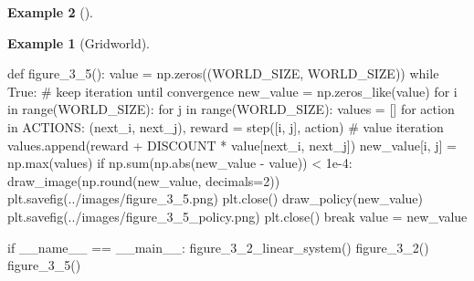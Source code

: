 \documentclass[
  letterpaper,
]{krantz}
\makeatletter
\newenvironment{Shaded}{\begin{snugshade}}{\end{snugshade}}
\newcommand{\BuiltInTok}[1]{\textcolor[rgb]{0.00,0.23,0.31}{#1}}
\newcommand{\CommentTok}[1]{\textcolor[rgb]{0.37,0.37,0.37}{#1}}
\newcommand{\ControlFlowTok}[1]{\textcolor[rgb]{0.00,0.23,0.31}{#1}}
\newcommand{\DecValTok}[1]{\textcolor[rgb]{0.68,0.00,0.00}{#1}}
\newcommand{\FloatTok}[1]{\textcolor[rgb]{0.68,0.00,0.00}{#1}}
\newcommand{\KeywordTok}[1]{\textcolor[rgb]{0.00,0.23,0.31}{#1}}
\newcommand{\NormalTok}[1]{\textcolor[rgb]{0.00,0.23,0.31}{#1}}
\newcommand{\OperatorTok}[1]{\textcolor[rgb]{0.37,0.37,0.37}{#1}}
\newcommand{\StringTok}[1]{\textcolor[rgb]{0.13,0.47,0.30}{#1}}
\newcommand{\VariableTok}[1]{\textcolor[rgb]{0.07,0.07,0.07}{#1}}
\newenvironment{kframe}{%
\medskip{}
\setlength{\fboxsep}{.8em}
 \def\at@end@of@kframe{}%
 \ifinner\ifhmode%
  \def\at@end@of@kframe{\end{minipage}}%
  \begin{minipage}{\columnwidth}%
 \fi\fi%
 \def\FrameCommand##1{\hskip\@totalleftmargin \hskip-\fboxsep
 \colorbox{shadecolor}{##1}\hskip-\fboxsep
     \hskip-\linewidth \hskip-\@totalleftmargin \hskip\columnwidth}%
 \MakeFramed {\advance\hsize-\width
   \@totalleftmargin\z@ \linewidth\hsize
   \@setminipage}}%
 {\par\unskip\endMakeFramed%
 \at@end@of@kframe}
\renewenvironment{Shaded}{\begin{kframe}}{\end{kframe}}
\theoremstyle{plain}
\theoremstyle{definition}
\newtheorem{example}{Example}[chapter]
\theoremstyle{definition}
\theoremstyle{remark}
\makeatother
\begin{document}
\begin{example}[]
\begin{example}[Gridworld]
\begin{tcolorbox}[enhanced jigsaw, bottomrule=.15mm, opacityback=0, breakable, colframe=quarto-callout-tip-color-frame, left=2mm, rightrule=.15mm, toprule=.15mm, leftrule=.75mm, arc=.35mm, colback=white]
\begin{codelisting}[H]
\begin{Shaded}
\begin{Highlighting}[]
\KeywordTok{def}\NormalTok{ figure\_3\_5():}
\NormalTok{    value }\OperatorTok{=}\NormalTok{ np.zeros((WORLD\_SIZE, WORLD\_SIZE))}
    \ControlFlowTok{while} \VariableTok{True}\NormalTok{:}
        \CommentTok{\# keep iteration until convergence}
\NormalTok{        new\_value }\OperatorTok{=}\NormalTok{ np.zeros\_like(value)}
        \ControlFlowTok{for}\NormalTok{ i }\KeywordTok{in} \BuiltInTok{range}\NormalTok{(WORLD\_SIZE):}
            \ControlFlowTok{for}\NormalTok{ j }\KeywordTok{in} \BuiltInTok{range}\NormalTok{(WORLD\_SIZE):}
\NormalTok{                values }\OperatorTok{=}\NormalTok{ []}
                \ControlFlowTok{for}\NormalTok{ action }\KeywordTok{in}\NormalTok{ ACTIONS:}
\NormalTok{                    (next\_i, next\_j), reward }\OperatorTok{=}\NormalTok{ step([i, j], action)}
                    \CommentTok{\# value iteration}
\NormalTok{                    values.append(reward }\OperatorTok{+}\NormalTok{ DISCOUNT }\OperatorTok{*}\NormalTok{ value[next\_i, next\_j])}
\NormalTok{                new\_value[i, j] }\OperatorTok{=}\NormalTok{ np.}\BuiltInTok{max}\NormalTok{(values)}
        \ControlFlowTok{if}\NormalTok{ np.}\BuiltInTok{sum}\NormalTok{(np.}\BuiltInTok{abs}\NormalTok{(new\_value }\OperatorTok{{-}}\NormalTok{ value)) }\OperatorTok{\textless{}} \FloatTok{1e{-}4}\NormalTok{:}
\NormalTok{            draw\_image(np.}\BuiltInTok{round}\NormalTok{(new\_value, decimals}\OperatorTok{=}\DecValTok{2}\NormalTok{))}
\NormalTok{            plt.savefig(}\StringTok{\textquotesingle{}../images/figure\_3\_5.png\textquotesingle{}}\NormalTok{)}
\NormalTok{            plt.close()}
\NormalTok{            draw\_policy(new\_value)}
\NormalTok{            plt.savefig(}\StringTok{\textquotesingle{}../images/figure\_3\_5\_policy.png\textquotesingle{}}\NormalTok{)}
\NormalTok{            plt.close()}
            \ControlFlowTok{break}
\NormalTok{        value }\OperatorTok{=}\NormalTok{ new\_value}


\ControlFlowTok{if} \VariableTok{\_\_name\_\_} \OperatorTok{==} \StringTok{\textquotesingle{}\_\_main\_\_\textquotesingle{}}\NormalTok{:}
\NormalTok{    figure\_3\_2\_linear\_system()}
\NormalTok{    figure\_3\_2()}
\NormalTok{    figure\_3\_5()}
\end{Highlighting}
\end{Shaded}

\end{codelisting}

\end{tcolorbox}

\end{example}


\end{example}
\end{document}
